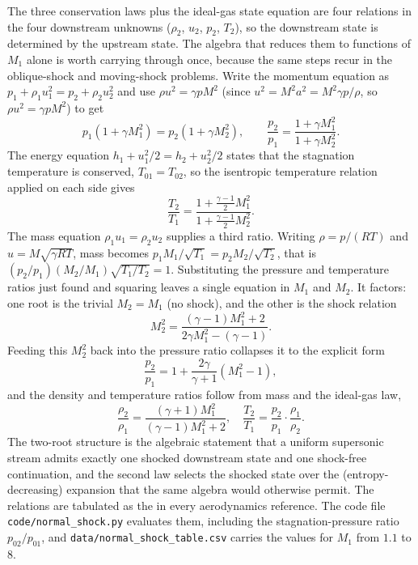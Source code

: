 The three conservation laws plus the ideal-gas state equation are
four relations in the four downstream unknowns ($\rho_2$, $u_2$,
$p_2$, $T_2$), so the downstream state is determined by the upstream
state. The algebra that reduces them to functions of $M_1$ alone is
worth carrying through once, because the same steps recur in the
oblique-shock and moving-shock problems. Write the momentum equation
as $p_1 + \rho_1 u_1^2 = p_2 + \rho_2 u_2^2$ and use $\rho u^2 =
\gamma p M^2$ (since $u^2 = M^2 a^2 = M^2 \gamma p/\rho$, so $\rho
u^2 = \gamma p M^2$) to get
\[
p_1(1 + \gamma M_1^2) = p_2(1 + \gamma M_2^2),
\qquad
\frac{p_2}{p_1} = \frac{1 + \gamma M_1^2}{1 + \gamma M_2^2}.
\]
The energy equation $h_1 + u_1^2/2 = h_2 + u_2^2/2$ states that the
stagnation temperature is conserved, $T_{01} = T_{02}$, so the
isentropic temperature relation applied on each side gives
\[
\frac{T_2}{T_1} = \frac{1 + \frac{\gamma - 1}{2}M_1^2}
{1 + \frac{\gamma - 1}{2}M_2^2}.
\]
The mass equation $\rho_1 u_1 = \rho_2 u_2$ supplies a third ratio.
Writing $\rho = p/(RT)$ and $u = M\sqrt{\gamma R T}$, mass becomes
$p_1 M_1/\sqrt{T_1} = p_2 M_2/\sqrt{T_2}$, that is $(p_2/p_1)
(M_2/M_1)\sqrt{T_1/T_2} = 1$. Substituting the pressure and
temperature ratios just found and squaring leaves a single equation
in $M_1$ and $M_2$. It factors: one root is the trivial $M_2 = M_1$
(no shock), and the other is the shock relation
\[
M_2^2 = \frac{(\gamma - 1)M_1^2 + 2}{2\gamma M_1^2 - (\gamma - 1)}.
\]
Feeding this $M_2^2$ back into the pressure ratio collapses it to
the explicit form
\[
\frac{p_2}{p_1} = 1 + \frac{2\gamma}{\gamma + 1}(M_1^2 - 1),
\]
and the density and temperature ratios follow from mass and the
ideal-gas law,
\[
\frac{\rho_2}{\rho_1} = \frac{(\gamma + 1)M_1^2}{(\gamma - 1)M_1^2
+ 2}, \quad
\frac{T_2}{T_1} = \frac{p_2}{p_1}\cdot\frac{\rho_1}{\rho_2}.
\]
The two-root structure is the algebraic statement that a uniform
supersonic stream admits exactly one shocked downstream state and
one shock-free continuation, and the second law selects the shocked
state over the (entropy-decreasing) expansion that the same algebra
would otherwise permit. The relations are tabulated as the
in every aerodynamics reference. The code file
\texttt{code/normal\_shock.py} evaluates them, including the
stagnation-pressure ratio $p_{02}/p_{01}$, and
\texttt{data/normal\_shock\_table.csv} carries the values for $M_1$
from $1.1$ to $8$.



